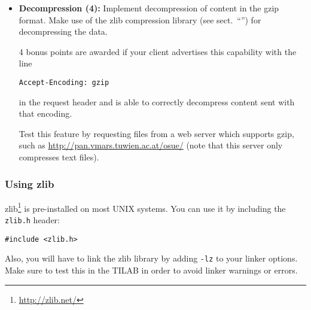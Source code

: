 \begin{itemize}

\item \textbf{Decompression (4):}
Implement decompression of content in the gzip format.
Make use of the zlib compression library (see sect.~``'')
for decompressing the data.

4 bonus points are awarded if your client advertises this capability with the line

\verb|Accept-Encoding: gzip|

in the request header and is able to correctly decompress content sent with that encoding.

Test this feature by requesting files from a web server which supports gzip,
such as \url{http://pan.vmars.tuwien.ac.at/osue/}
(note that this server only compresses text files).




\end{itemize}

\subsubsection*{Using zlib}
\label{sect:zlib}

zlib\footnote{\url{http://zlib.net/}} is pre-installed on most UNIX systems.
You can use it by including the \texttt{zlib.h} header:

\verb|#include <zlib.h>|

Also, you will have to link the zlib library by adding \texttt{-lz} to your linker options.
Make sure to test this in the TILAB in order to avoid linker warnings or errors.




\osueguidelinesone


